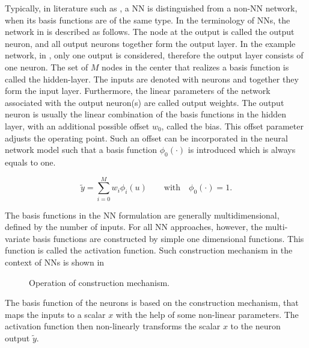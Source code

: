 \vspace{-3mm}

Typically, in literature such as \cite{nelles2013nonlinear, norgaard2003neural}, a NN is distinguished from a non-NN network, when its basis functions are of the same type. In the terminology of NNs, the network in  is described as follows. The node at the output is called the output neuron, and all output neurons together form the output layer. In the example network, in , only one output is considered, therefore the output layer consists of one neuron. The set of $M$ nodes in the center that realizes a basis function is called the hidden-layer. The inputs are denoted with neurons and together they form the input layer. Furthermore, the linear parameters of the network associated with the output neuron(s) are called output weights. The output neuron is usually the linear combination of the basis functions in the hidden layer, with an additional possible offset $w_0$, called the bias. This offset parameter adjusts the operating point. Such an offset can be incorporated in the neural network model such that a basis function $\phi_0(\cdot)$ is introduced which is always equals to one. 

 \begin{equation}
\label{basis_NN_eq_lin_bias}
\tilde{y} = \sum_{i = 0}^M w_i \phi_i(u) \qquad \text{with} \quad \phi_0(\cdot) = 1.
\end{equation}

The basis functions in the NN formulation are generally multidimensional, defined by the number of inputs. For all NN approaches, however, the multi-variate basis functions are constructed by simple one dimensional functions\cite{nelles2013nonlinear}. This function is called the activation function. Such construction mechanism in the context of NNs is shown in 

\begin{figure}[H]
\centering
 
\caption{Operation of construction mechanism.}
\label{fig:activation_mechanism}
\end{figure}

\vspace{-3mm}

The basis function of the neurons is based on the construction mechanism, that maps the inputs to a scalar $x$ with the help of some non-linear parameters. The activation function then non-linearly transforms the scalar $x$ to the neuron output $\tilde{y}$. 

